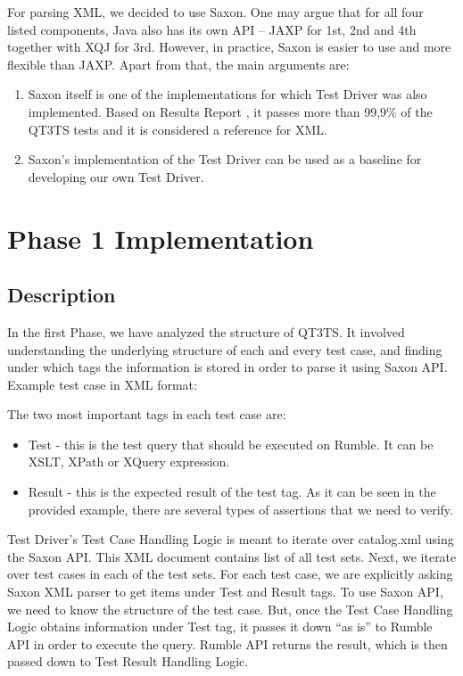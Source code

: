 For parsing XML, we decided to use Saxon. One may argue that for all four listed components, Java also has its own API – JAXP for 1st, 2nd and 4th together with XQJ for 3rd. However, in practice, Saxon is easier to use and more flexible than JAXP. Apart from that, the main arguments are:
\begin{enumerate}
	\item Saxon itself is one of the implementations for which Test Driver was also implemented. Based on Results Report \cite{SaxonReport}, it passes more than 99,9\% of the QT3TS tests and it is considered a reference for XML.
	\item Saxon's implementation of the Test Driver can be used as a baseline for developing our own Test Driver. 
\end{enumerate}

\section{Phase 1 Implementation}
\subsection{Description}
\label{Phase1_Description}
In the first Phase, we have analyzed the structure of QT3TS. It involved understanding the underlying structure of each and every test case, and finding under which tags the information is stored in order to parse it using Saxon API. Example test case in XML format:



The two most important tags in each test case are:
\begin{itemize}
	\item Test  - this is the test query that should be executed on Rumble. It can be XSLT, XPath or XQuery expression.
	\item Result - this is the expected result of the test tag. As it can be seen in the provided example, there are several types of assertions that we need to verify.
\end{itemize}

Test Driver's Test Case Handling Logic is meant to iterate over catalog.xml using the Saxon API. This XML document contains list of all test sets. Next, we iterate over test cases in each of the test sets. For each test case, we are explicitly asking Saxon XML parser to get items under Test and Result tags. To use Saxon API, we need to know the structure of the test case. But, once the Test Case Handling Logic obtains information under Test tag, it passes it down ``as is'' to Rumble API in order to execute the query. Rumble API returns the result, which is then passed down to Test Result Handling Logic. 

